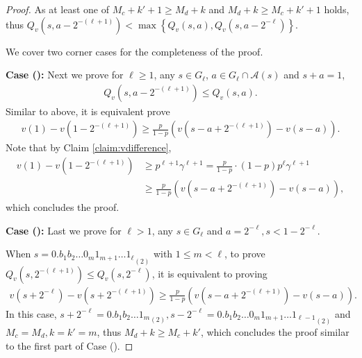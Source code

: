 \documentclass{article}
\theoremstyle{named}
\newcommand{\cA}{\mathcal{A}}
\newcommand{\set}[1]{\left\{#1\right\}}
\newcommand{\bracket}[1]{\left(#1\right)}
\begin{document}
\begin{proof}
As at least one of $M_c+k'+1 \geq M_d+k$ and $M_d + k \ge M_c + k' + 1$ holds, thus $Q_v\bracket{s,a-2^{-(\ell+1)}} < \max\set{Q_v(s,a), Q_v\bracket{s,a-2^{-\ell}}}$.

We cover two corner cases for the completeness of the proof.

\textbf{Case ():} Next we prove for $\ell \ge 1$, any $s\in G_\ell$, $a\in G_\ell \cap \cA(s)$ and $s+a=1$,
\begin{align*}
    Q_v\bracket{s,a-2^{-(\ell+1)}} \le Q_v(s,a) .
\end{align*}
Similar to above, it is equivalent prove
\begin{align*}
    v(1) - v\bracket{1-2^{-(\ell+1)}} \ge \frac{p}{1-p} \bracket{v\bracket{s-a+2^{-(\ell+1)}} - v(s-a)} .
\end{align*}
Note that by Claim \ref{claim:vdifference},
\begin{align*}
    v(1) - v\bracket{1-2^{-(\ell+1)}} &\ge p^{\ell+1} \gamma^{\ell+1} = \frac{p}{1-p} \cdot (1-p)p^\ell\gamma^{\ell+1}\\
    &\ge \frac{p}{1-p} \bracket{v\bracket{s-a+2^{-(\ell+1)}} - v(s-a)}  ,
\end{align*}
which concludes the proof.

\textbf{Case ():} Last we prove for $\ell > 1$, any $s\in G_{\ell}$ and $a=2^{-\ell}, s<1-2^{-\ell}$. 

When $s={0.b_1 b_2 \dots 0_{m} 1_{m+1} \dots 1_{\ell}}_{(2)}$ with $1\le m < \ell$, to prove
$Q_v\bracket{s,2^{-(\ell+1)}} \le Q_v\bracket{s,2^{-\ell}}$, it is equivalent to proving 
\begin{align*}
    v\bracket{s+2^{-\ell}} - v\bracket{s+2^{-(\ell+1)}} \ge \frac{p}{1-p} \bracket{v\bracket{s-a+2^{-(\ell+1)}} - v(s-a)} .
\end{align*}
In this case, $s+2^{-\ell} = {0.b_1 b_2 \dots 1_{m}}_{(2)}, s-2^{-\ell}={0.b_1 b_2 \dots 0_{m} 1_{m+1} \dots 1_{\ell-1}}_{(2)}$ and $M_c=M_d,k=k'=m$, thus $M_d+k\ge M_c+k'$, which concludes the proof similar to the first part of Case ().


\end{proof}
\end{document}
